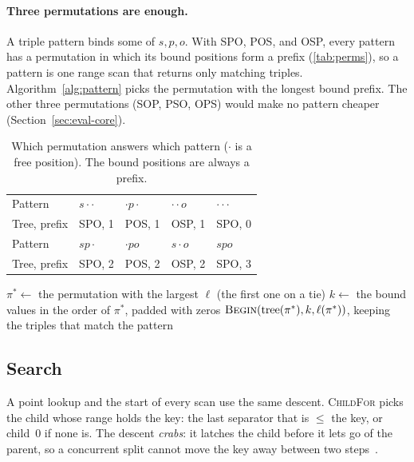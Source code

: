 \documentclass[sigconf, nonacm]{acmart}
\begin{document}
\paragraph{Three permutations are enough.} A triple pattern binds some of $s,p,o$. With SPO, POS, and OSP, every pattern has a permutation in which its bound positions form a prefix (\autoref{tab:perms}), so a pattern is one range scan that returns only matching triples. Algorithm~\ref{alg:pattern} picks the permutation with the longest bound prefix. The other three permutations (SOP, PSO, OPS) would make no pattern cheaper (Section~\ref{sec:eval-core}).

\begin{table}[t]
\caption{Which permutation answers which pattern ($\cdot$ is a free position). The bound positions are always a prefix.}
\label{tab:perms}
\small
\begin{tabular}{@{}lllll@{}}
\toprule
Pattern & $s\cdot\cdot$ & $\cdot p\cdot$ & $\cdot\cdot o$ & $\cdot\cdot\cdot$ \\
Tree, prefix & SPO, 1 & POS, 1 & OSP, 1 & SPO, 0 \\
\midrule
Pattern & $sp\cdot$ & $\cdot po$ & $s\cdot o$ & $spo$ \\
Tree, prefix & SPO, 2 & POS, 2 & OSP, 2 & SPO, 3 \\
\bottomrule
\end{tabular}
\end{table}

\begin{algorithm}[t]
\caption{\textsc{ScanFor}$(s,p,o)$: choose a tree for a triple pattern}\label{alg:pattern}
\small
{}
$\pi^* \gets$ the permutation with the largest $\ell$ (the first one on a tie)\;
$k \gets$ the bound values in the order of $\pi^*$, padded with zeros\;
\Return $\textsc{Begin}(\text{tree}(\pi^*), k, \ell(\pi^*))$, keeping the triples that match the pattern\;
\end{algorithm}

\subsection{Search}

A point lookup and the start of every scan use the same descent. \textsc{ChildFor} picks the child whose range holds the key: the last separator that is $\le$ the key, or child~0 if none is. The descent \emph{crabs}: it latches the child before it lets go of the parent, so a concurrent split cannot move the key away between two steps~\cite{lehman1981,graefe2011}.
\end{document}
